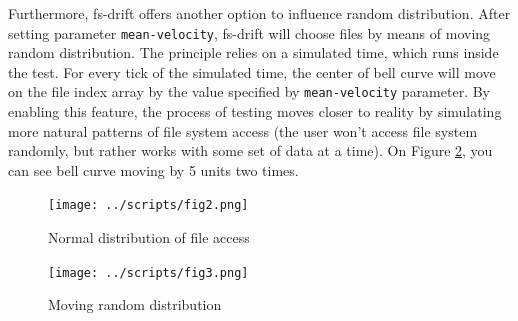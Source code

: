 \documentclass[
  color, %
  table, %
  lof,   %
  lot,   %
]{fithesis3}
\begin{document}
Furthermore, fs-drift offers another option to influence random distribution. After setting parameter \texttt{mean-velocity}, fs-drift will choose files by means of moving random distribution. The principle relies on a simulated time, which runs inside the test. For every tick of the simulated time, the center of bell curve will move on the file index array by the value specified by \texttt{mean-velocity} parameter. By enabling this feature, the process of testing moves closer to reality by simulating more natural patterns of file system access (the user won't access file system randomly, but rather works with some set of data at a time). On Figure \ref{fig:rand3}, you can see bell curve moving by 5 units two times.

\begin{figure}[!htb]
    \begin{minipage}{\textwidth}
        \centering
        \texttt{[image: ../scripts/fig2.png]}
        \caption{Normal distribution of file access}

\label{fig:rand2}
    \end{minipage}

\end{figure}
\begin{figure}
    \begin{minipage}{\textwidth}
        \centering
        \texttt{[image: ../scripts/fig3.png]}
        \caption{Moving random distribution}
\label{fig:rand3}
    \end{minipage}
\end{figure}


\end{document}
